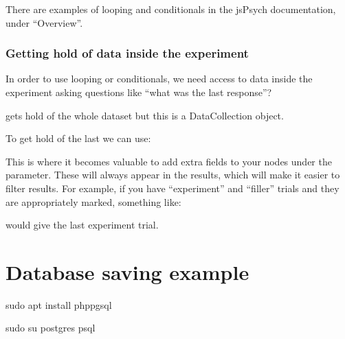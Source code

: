 \documentclass[letterpaper,10pt,english]{sphinxmanual}
\begin{document}
There are examples of looping and conditionals in the jsPsych documentation,
under “Overview”.


\subsection{Getting hold of data inside the experiment}
\label{\detokenize{jspsych_au:getting-hold-of-data-inside-the-experiment}}
In order to use looping or conditionals, we need access to data inside the
experiment \textendash{} asking questions like “what was the last response”?

\begin{sphinxVerbatim}[commandchars=\\\{\}]
\end{sphinxVerbatim}

gets hold of the whole dataset \textendash{} but this is a DataCollection object.

To get hold of the last  we can use:

\begin{sphinxVerbatim}[commandchars=\\\{\}]
\PYG{p}{[}\PYG{p}{]}
\end{sphinxVerbatim}

This is where it becomes valuable to add extra fields to your nodes under the
 parameter. These will always appear in the results, which will make it
easier to filter results. For example, if you have “experiment” and “filler”
trials and they are appropriately marked, something like:

\begin{sphinxVerbatim}[commandchars=\\\{\}]
 \PYG{p}{[}\PYG{p}{]}
\end{sphinxVerbatim}

would give the last experiment trial.


\chapter{Database saving example}
\label{\detokenize{database_saving:database-saving-example}}\label{\detokenize{database_saving::doc}}
\begin{sphinxVerbatim}[commandchars=\\\{\}]
sudo apt install php\PYGZhy{}pgsql

sudo su \PYGZhy{} postgres
psql
\end{sphinxVerbatim}
\end{document}
